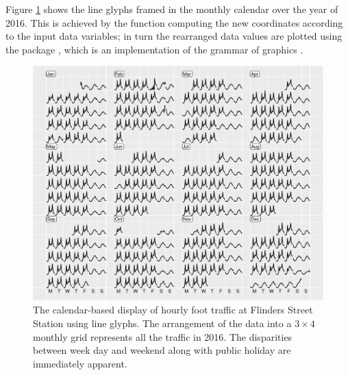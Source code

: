 \documentclass[article]{jss}
\theoremstyle{definition}
\theoremstyle{definition}
\theoremstyle{remark}
\begin{document}
Figure \ref{fig:flinders-2016} shows the line glyphs framed in the
monthly calendar over the year of 2016. This is achieved by the
 function computing the new coordinates according
to the input data variables; in turn the rearranged data values are
plotted using the  package \citep{R-ggplot2}, which is an
implementation of the grammar of graphics
\citep{wilkinson2006grammar, wickham2010layered}.

\begin{CodeChunk}
\begin{figure}

{\centering \includegraphics[width=\textwidth]{figure/flinders-2016-1} 

}

\caption[The calendar-based display of hourly foot
traffic at Flinders Street Station using line glyphs. The arrangement of
the data into a \(3 \times 4\) monthly grid represents all the traffic
in 2016. The disparities between week day and weekend along with public
holiday are immediately apparent.]{The calendar-based display of hourly foot
traffic at Flinders Street Station using line glyphs. The arrangement of
the data into a \(3 \times 4\) monthly grid represents all the traffic
in 2016. The disparities between week day and weekend along with public
holiday are immediately apparent.}\label{fig:flinders-2016}
\end{figure}
\end{CodeChunk}
\end{document}
